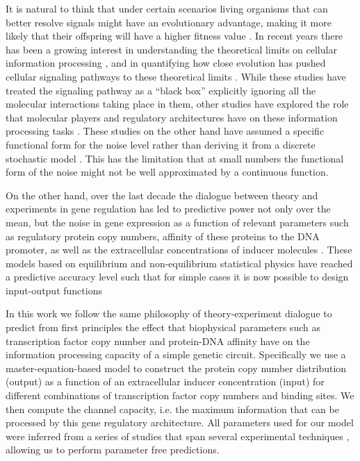It is natural to think that under certain scenarios living organisms that can
better resolve signals might have an evolutionary advantage, making it more
likely that their offspring will have a higher fitness value \cite{Taylor2007a}.
In recent years there has been a growing interest in understanding the
theoretical limits on cellular information processing \cite{Bialek2005,
Gregor2007}, and in quantifying how close evolution has pushed cellular
signaling pathways to these theoretical limits \cite{Tkacik2008, Dubuis2013,
Petkova2016}. While these studies have treated the signaling pathway as a
``black box'' explicitly ignoring all the molecular interactions taking place in
them, other studies have explored the role that molecular players and regulatory
architectures have on these information processing tasks \cite{Rieckh2014,
Ziv2007, Voliotis2014, Tostevin2009, Tkacik2011, Tkacik2008a, Tabbaa2014}. These
studies on the other hand have assumed a specific functional form for the noise
level rather than deriving it from a discrete stochastic model . This has the limitation that at small numbers the functional
form of the noise might not be well approximated by a continuous function.

On the other hand, over the last decade the dialogue between theory and
experiments in gene regulation has led to predictive power not only over the
mean, but the noise in gene expression as a function of relevant parameters such
as regulatory protein copy numbers, affinity of these proteins to the DNA
promoter, as well as the extracellular concentrations of inducer
molecules \cite{Garcia2011c, Jones2014a, Brewster2014, Razo-Mejia2018} . These models based on equilibrium and
non-equilibrium statistical physics have reached a predictive accuracy level
such that for simple cases it is now possible to design input-output functions
\cite{Brewster2012} 

In this work we follow the same philosophy of theory-experiment dialogue to
predict from first principles the effect that biophysical parameters such as
transcription factor copy number and protein-DNA affinity have on the
information processing capacity of a simple genetic circuit. Specifically we use
a master-equation-based model to construct the protein copy number distribution
(output) as a function of an extracellular inducer concentration (input) for
different combinations of transcription factor copy numbers and binding sites.
We then compute the channel capacity, i.e. the maximum information that can be
processed by this gene regulatory architecture. All parameters used for our
model were inferred from a series of studies that span several experimental
techniques \cite{Elf2007, Garcia2011c, Brewster2012, Jones2014a, Brewster2014,
Razo-Mejia2018} , allowing us to
perform parameter free predictions. 

